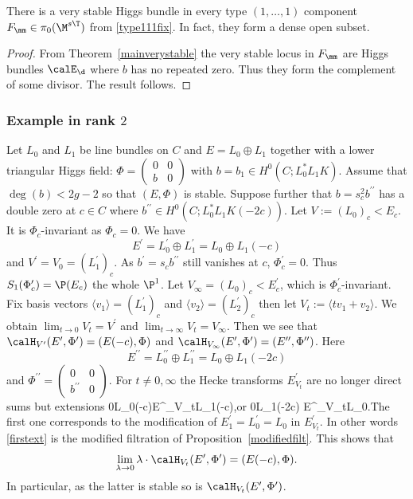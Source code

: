 \begin{corollary}
\notready \label{type111} There is a very stable Higgs bundle in every type $(1,\dots,1)$ component $F_{\mm}\in \pi_0(\M^{s\T})$ from \eqref{type111fix}. In fact, they form a dense open subset.
\end{corollary}

\begin{proof} From Theorem~\ref{mainverystable} the very stable locus in $F_{\mm}$ are Higgs bundles $\calE_{\d}$ where $b$ has no repeated zero. Thus they form the complement of some divisor. The result follows.
\end{proof}

\subsubsection{Example in rank $2$}

Let $L_0$ and $L_1$ be line bundles on $C$ and $E=L_0\oplus L_1$ together with a lower triangular Higgs field: $\Phi=\left(\begin{array}{cc}0&0\\b&0\end{array} \right)$ with $b=b_1\in H^0(C;L_0^*L_1K)$. Assume that $\deg(b)<2g-2$ so that $(E,\Phi)$ is stable. Suppose further that $b=s_c^2 b^{\prime\prime}$ has a double zero at $c\in C$ where $b^{\prime\prime}\in H^0(C;L^*_0L_1K(-2c)).$ Let $V:=(L_0)_c< E_c$. It is $\Phi_c$-invariant as $\Phi_c=0$. We have $$E^\prime=L_0^\prime\oplus L_1^\prime=L_0\oplus L_1(-c)$$ and $V^\prime=V_0= (L_1^\prime)_c$. As $b^\prime=s_c b^{\prime\prime}$ still vanishes at $c$, $\Phi^\prime_c=0$. Thus $S_{1}(\Phi^\prime_c)=\P(E_c)$ the whole $\P^1$. Let $V_\infty=(L_0)_c<E^\prime_c$, which is $\Phi^\prime_c$-invariant. Fix basis vectors $\langle v_1\rangle=(L^\prime_1)_c$ and $\langle v_2 \rangle=(L^\prime_2)_c$ then let $V_t:=\langle tv_1+v_2 \rangle.$
We obtain $\lim_{t\to 0} V_t=V^\prime$ and $\lim_{t\to \infty} V_t=V_\infty$. Then we see that $\calH_{V^\prime}(E^\prime,\Phi^\prime)=(E(-c),\Phi)$ and  $\calH_{V_\infty}(E^\prime,\Phi^\prime)=(E^{\prime\prime},\Phi^{\prime\prime})$. Here $$E^{\prime\prime}=L_0^{\prime\prime}\oplus L_1^{\prime\prime}=L_0\oplus L_1(-2c)$$ and $\Phi^{\prime\prime}=\left(\begin{array}{cc}0&0\\b^{\prime\prime}&0\end{array}\right).$ For $t\neq 0,\infty$ the Hecke transforms $E^\prime_{V_t}$ are no longer direct sums but extensions \beq \label{firstext}0\to L_0(-c)\to E^\prime_{V_t}\to L_1(-c),\eeq or \beq \label{secondext}0\to L_1(-2c) \to E^\prime_{V_t}\to L_0.\eeq The first one corresponds to  the modification of $E^\prime_1=L_0^\prime=L_0$ in $E^\prime_{V_t}$. In other words \eqref{firstext} is the modified filtration of Proposition~\ref{modifiedfilt}. This shows that $$\lim_{\lambda\to 0}\lambda\cdot \calH_{V_t}(E^\prime,\Phi^\prime) = (E(-c),\Phi).$$ In particular, as the latter is stable so is $\calH_{V_t}(E^\prime,\Phi^\prime)$.

